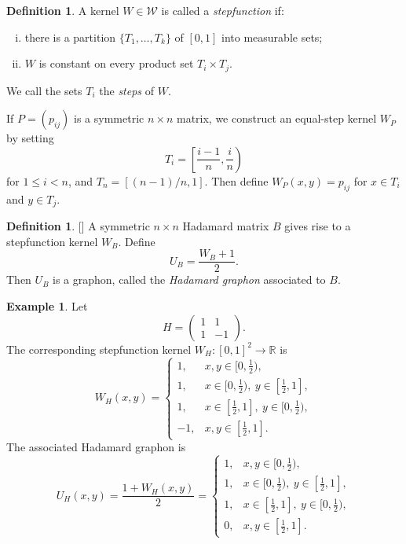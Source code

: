\documentclass[a4paper,12pt]{article}
\let\cite\parencite
\theoremstyle{definition}
\newtheorem{definition}[lemma]{Definition}
\newtheorem{example}[lemma]{Example}
\newcommand\cW{\mathcal{W}}
\newcommand\R{\mathbb{R}}
\begin{document}
\begin{definition}\label{definition:stepfunction}
A kernel $W\in\cW$ is called a \textit{stepfunction} if:
\begin{enumerate}[(i)]
    \item there is a partition $\{T_1,\ldots,T_k\}$ of $[0,1]$ into measurable sets;
    \item $W$ is constant on every product set $T_i\times T_j$.
\end{enumerate}
We call the sets $T_i$ the \textit{steps} of $W$.
\end{definition}

If $P=(p_{ij})$ is a symmetric $n\times n$ matrix, we construct an equal-step kernel $W_P$ by setting
\[
    T_i=\left[\frac{i-1}{n},\frac{i}{n}\right)
\]
for $1\leq i<n$, and $T_n=[(n-1)/n,1]$. Then define $W_P(x,y)=p_{ij}$ for $x\in T_i$ and $y\in T_j$.

\begin{definition}\label{definition:hadamard graphons}[\cite[Example 14.35, p. 251]{hombook}]
A symmetric $n\times n$ Hadamard matrix $B$ gives rise to a stepfunction kernel $W_B$. Define
\[
    U_B=\frac{W_B+1}{2}.
\]
Then $U_B$ is a graphon, called the \textit{Hadamard graphon} associated to $B$.
\end{definition}

\begin{example}\label{example: standard H}
Let
\[
    H=\begin{pmatrix}1&1\\1&-1\end{pmatrix}.
\]
The corresponding stepfunction kernel $W_H:[0,1]^2\to\R$ is
\[
W_H(x,y)=
\begin{cases}
1, & x,y\in [0,\frac12),\\
1, & x\in [0,\frac12),\ y\in [\frac12,1],\\
1, & x\in [\frac12,1],\ y\in [0,\frac12),\\
-1, & x,y\in [\frac12,1].
\end{cases}
\]
The associated Hadamard graphon is
\[
U_H(x,y)=\frac{1+W_H(x,y)}{2}=
\begin{cases}
1, & x,y\in [0,\frac12),\\
1, & x\in [0,\frac12),\ y\in [\frac12,1],\\
1, & x\in [\frac12,1],\ y\in [0,\frac12),\\
0, & x,y\in [\frac12,1].
\end{cases}
\]
\end{example}
\end{document}
